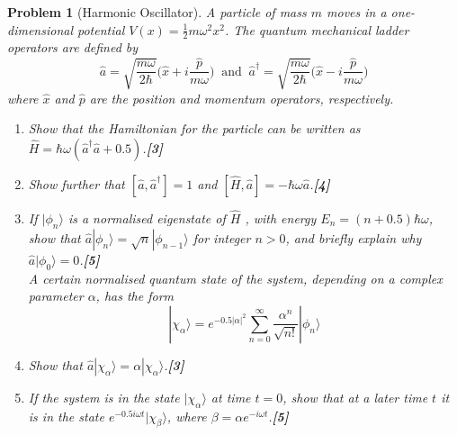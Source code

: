 \documentclass[a4paper]{article}
\theoremstyle{new}
\newtheorem{qns}{Problem}[subsection]
\begin{document}
\begin{qns}[Harmonic Oscillator]
A particle of mass $m$ moves in a one-dimensional potential $V(x)=\frac{1}{2}m\omega^2x^2$. The quantum mechanical ladder operators are defined by
$$\hat{a}=\sqrt{\frac{m\omega}{2\hbar}}\bigg(\hat{x}+i\frac{\hat{p}}{m\omega}\bigg)~\text{ and }~\hat{a}^\dag=\sqrt{\frac{m\omega}{2\hbar}}\bigg(\hat{x}-i\frac{\hat{p}}{m\omega}\bigg)$$
where $\hat{x}$ and $\hat{p}$ are the position and momentum operators, respectively.
\begin{enumerate}[label=(\roman*)]
\item Show that the Hamiltonian for the particle can be written as $\hat{H}=\hbar\omega(\hat{a}^\dag\hat{a}+0.5)$.\hfill\textbf{[3]}
\item Show further that $[\hat{a},\hat{a}^\dag]=1$ and $[\hat{H},\hat{a}]=-\hbar\omega\hat{a}$.\hfill\textbf{[4]}
\item If $|\phi_n\rangle$ is a normalised eigenstate of $\hat{H}$ , with energy $E_n=(n+0.5)\hbar\omega$, show that $\hat{a}|\phi_n\rangle=\sqrt{n}|\phi_{n-1}\rangle$ for integer $n > 0$, and briefly explain why $\hat{a}|\phi_0\rangle=0$.\hfill\textbf{[5]}\\[5pt]
A certain normalised quantum state of the system, depending on a complex parameter $\alpha$, has the form
$$|\chi_\alpha\rangle=e^{-0.5|\alpha|^2}\sum_{n=0}^\infty\frac{\alpha^n}{\sqrt{n!}}|\phi_n\rangle$$
\item Show that $\hat{a}|\chi_\alpha\rangle=\alpha|\chi_\alpha\rangle$.\hfill\textbf{[3]}
\item If the system is in the state $|\chi_\alpha\rangle$ at time $t = 0$, show that at a later time $t$ it is in the
state $e^{-0.5i\omega t}|\chi_\beta\rangle$, where $\beta=\alpha e^{-i\omega t}$.\hfill\textbf{[5]}
\end{enumerate}
\end{qns}
\end{document}
